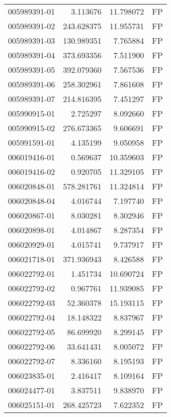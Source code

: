 \begin{tabular}{lrrl}
005989391-01 &    3.113676 &      11.798072 &   FP \\
005989391-02 &  243.628375 &      11.955731 &   FP \\
005989391-03 &  130.989351 &       7.765884 &   FP \\
005989391-04 &  373.693356 &       7.511900 &   FP \\
005989391-05 &  392.079360 &       7.567536 &   FP \\
005989391-06 &  258.302961 &       7.861608 &   FP \\
005989391-07 &  214.816395 &       7.451297 &   FP \\
005990915-01 &    2.725297 &       8.092660 &   FP \\
005990915-02 &  276.673365 &       9.606691 &   FP \\
005991591-01 &    4.135199 &       9.050958 &   FP \\
006019416-01 &    0.569637 &      10.359603 &   FP \\
006019416-02 &    0.920705 &      11.329105 &   FP \\
006020848-01 &  578.281761 &      11.324814 &   FP \\
006020848-04 &    4.016744 &       7.197740 &   FP \\
006020867-01 &    8.030281 &       8.302946 &   FP \\
006020898-01 &    4.014867 &       8.287354 &   FP \\
006020929-01 &    4.015741 &       9.737917 &   FP \\
006021718-01 &  371.936943 &       8.426588 &   FP \\
006022792-01 &    1.451734 &      10.690724 &   FP \\
006022792-02 &    0.967761 &      11.939085 &   FP \\
006022792-03 &   52.360378 &      15.193115 &   FP \\
006022792-04 &   18.148322 &       8.837967 &   FP \\
006022792-05 &   86.699920 &       8.299145 &   FP \\
006022792-06 &   33.641431 &       8.005072 &   FP \\
006022792-07 &    8.336160 &       8.195193 &   FP \\
006023835-01 &    2.416417 &       8.109164 &   FP \\
006024477-01 &    3.837511 &       9.838970 &   FP \\
006025151-01 &  268.425723 &       7.622352 &   FP \\

\end{tabular}
